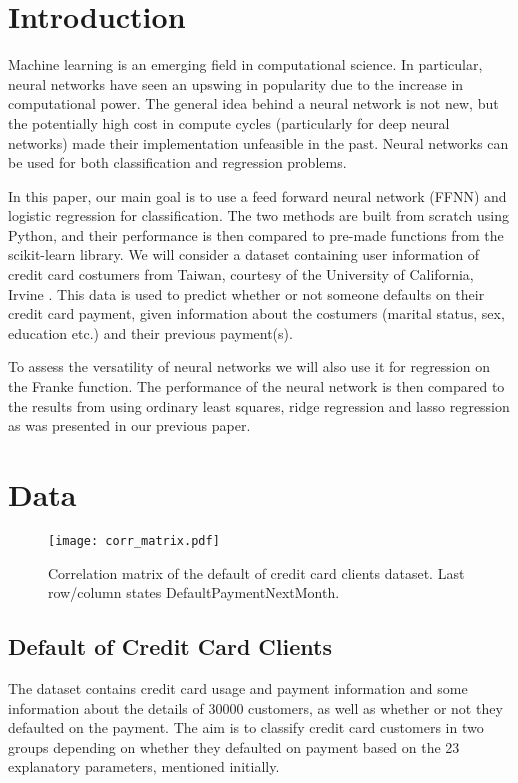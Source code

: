 \documentclass[%
 reprint,
nofootinbib,
 amsmath,amssymb,
 aps,
]{revtex4-2}
\begin{document}

\section{Introduction\label{sec:intro}}
Machine learning is an emerging field in computational science. In particular, neural networks have seen an upswing in popularity due to the increase in computational power. The general idea behind a neural network is not new, but the potentially high cost in compute cycles (particularly for deep neural networks) made their implementation unfeasible in the past. Neural networks can be used for both classification and regression problems.

In this paper, our main goal is to use a feed forward neural network (FFNN) and logistic regression for classification. The two methods are built from scratch using Python, and their performance is then compared to pre-made functions from the scikit-learn library. We will consider a dataset containing user information of credit card costumers from Taiwan, courtesy of the University of California, Irvine \cite{creditcard}. This data is used to predict whether or not someone defaults on their credit card payment, given information about the costumers (marital status, sex, education etc.) and their previous payment(s).

To assess the versatility of neural networks we will also use it for regression on the Franke function. The performance of the neural network is then compared to the results from using ordinary least squares, ridge regression and lasso regression as was presented in our previous paper.


\section{Data}
\begin{figure*}[t]
\texttt{[image: corr\_matrix.pdf]}
\caption{\label{fig:corr_matrix} Correlation matrix of the default of credit card clients dataset. Last row/column states DefaultPaymentNextMonth.}
\end{figure*}

\subsection{Default of Credit Card Clients}
The dataset contains credit card usage and payment information and some information about the details of 30000 customers, as well as whether or not they defaulted on the payment. The aim is to classify credit card customers in two groups depending on whether they defaulted on payment based on the 23 explanatory parameters, mentioned initially.
\end{document}
